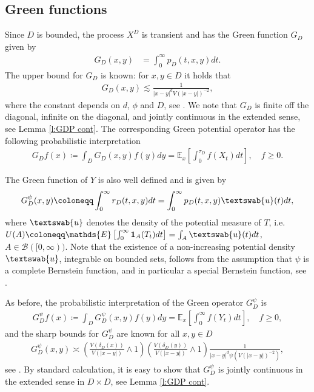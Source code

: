 \documentclass[12pt,a4paper,onecolumn]{article}
\theoremstyle{definition}
\newcommand{\ex}{\mathds{E}}
\newcommand{\1}{\mathbf 1}
\newcommand{\de}{\delta_D}
\newcommand{\BB}{\mathcal{B}}
\newcommand{\GDP}{G_D^\psi}
\newcommand{\uu}{\textswab{u}}
\numberwithin{equation}{section}
\begin{document}
    \subsection*{Green functions}
    Since  $D$ is bounded, the process $X^D$ is transient and has the Green function $G_D$  given by
	\begin{align*}
		G_D(x,y)&=\int_0^\infty p_D(t,x,y)dt.
	\end{align*}
	The upper bound for $G_D$ is known: for $x,y\in D$ it holds that
	\begin{align}\label{eq:GD sharp bound SBM}
		G_D(x,y)\lesssim 
		\frac{1}{|x-y|^d V(|x-y|)^{-2}},
	\end{align}
	where the constant depends on $d$, $\phi$ and $D$, see \cite[Lemma 2.1]{ksv2020boundary}. We note that $G_D$ is finite off the diagonal,  infinite on the diagonal, and jointly continuous in the extended sense, see Lemma \ref{l:GDP cont}. The corresponding Green potential operator has the following probabilistic interpretation
    \begin{align*}
    	G_D f(x)\coloneqq \int_D G_D(x,y)f(y)dy=\ex_{x}\left[\int_0^{\tau_D}f(X_t)dt\right],\quad f\ge 0.
    \end{align*}

	The Green function of $Y$ is also well defined and is given by
        \begin{align}\label{eq:GDP_representation}
		\GDP(x,y)\coloneqq \int_0^\infty r_D(t,x,y)dt=\int_0^\infty p_D(t,x,y)\uu(t)dt,
	\end{align}
        where $\uu$ denotes the density of the potential measure of $T$, i.e. 
        $U(A)\coloneqq  \ex\left[\int_0^\infty \1_A(T_t)dt\right]=\int_A \uu(t)dt$, $A\in \BB([0,\infty))$. Note that the existence of a non-increasing potential density $\uu$, integrable on bounded sets, follows from the assumption that $\psi$ is a complete Bernstein function, and in particular a special Bernstein function, see \cite[Chapter 11]{bernstein}.
        
        As before, the probabilistic interpretation of the Green operator $\GDP$ is
        \begin{align*}
        	\GDP f(x)\coloneqq \int_D \GDP(x,y)f(y)dy=\ex_{x}\left[\int_0^{\infty}f(Y_t)dt\right],\quad f\ge 0,
        \end{align*}
        and the sharp bounds for $\GDP$ are known for all $x,y\in D$
	\begin{align}\label{eq:GDP sharp}
		\GDP(x,y)\asymp \left(\frac{V(\de(x))}{V(|x-y|)}\wedge 1\right)\left(\frac{V(\de(y))}{V(|x-y|)}\wedge 1\right)\frac{1}{|x-y|^{d}\psi(V(|x-y|)^{-2})},
	\end{align}
	see \cite[Theorem 6.4]{ksv2020boundary}.
    By standard calculation, it is easy to show that $\GDP$ is jointly continuous in the extended sense in $D\times D$, see Lemma \ref{l:GDP cont}.    
\end{document}
